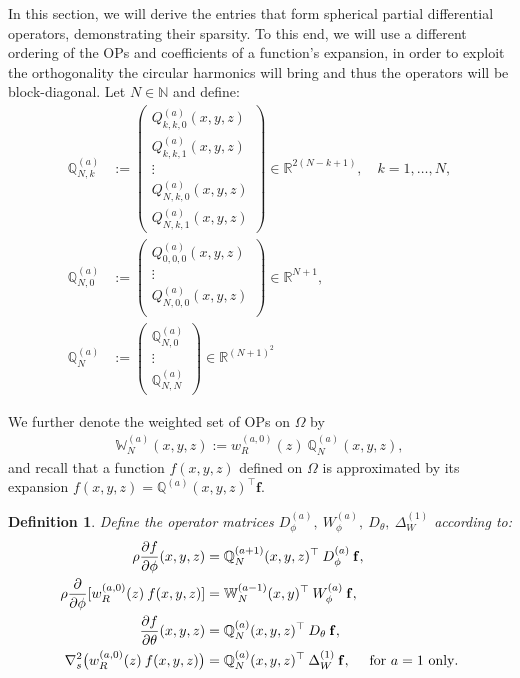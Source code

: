 \documentclass[11pt, oneside]{article}   	%
\newcommand{\R}{\mathbb{R}}
\newcommand{\N}{\mathbb{N}}
\newcommand{\genjac}{R}
\newcommand{\genjacw}{w_\genjac}
\newcommand{\bigW}{\mathbb{W}}
\newcommand{\scop}{Q}
\newcommand{\scopa}{\scop^{(a)}}
\newcommand{\bigscop}{{\mathbb{Q}}}
\newcommand{\bigscopa}{\bigscop^{(a)}}
\newcommand{\bigscopNa}{\bigscopa_{N}}
\newcommand{\bigscopNka}{\bigscopa_{N,k}}
\newcommand{\bigWNa}{\mathbb{W}_N^{(a)}}
\newtheorem{definition}{Definition}
\begin{document}
In this section, we will derive the entries that form spherical partial differential operators, demonstrating their sparsity. To this end, we will use a different ordering of the OPs and coefficients of a function's expansion, in order to exploit the orthogonality the circular harmonics will bring and thus the operators will be block-diagonal. Let $N \in \N$ and define: 
\begin{align}
	\bigscopNka &:= 
		\begin{pmatrix}
			\scopa_{k,k,0}(x,y,z) \\
			\scopa_{k,k,1}(x,y,z) \\
			\vdots \\
			\scopa_{N,k,0}(x,y,z) \\
			\scopa_{N,k,1}(x,y,z)
		\end{pmatrix} \in \R^{2(N-k+1)},  \quad k = 1,\dots,N, \label{eqn:OPdefNka} \\ 
	\bigscopa_{N,0} &:= 
		\begin{pmatrix}
			\scopa_{0,0,0}(x,y,z) \\
			\vdots \\
			\scopa_{N,0,0}(x,y,z) \\
		\end{pmatrix} \in \R^{N+1}, \label{eqn:OPdefN0a} \\
	\bigscopNa &:= 
		\begin{pmatrix}
			\bigscopa_{N,0} \\
			\vdots \\
			\bigscopa_{N,N}
		\end{pmatrix} \in \R^{(N+1)^2} \label{eqn:OPdefNa}
\end{align}

We further denote the weighted set of OPs on $\Omega$ by 
\begin{align*}
	\bigWNa(x,y,z) := \genjacw^{(a,0)}(z) \: \bigscopNa(x,y,z),
\end{align*}
and recall that a function $f(x,y,z)$ defined on $\Omega$ is approximated by its expansion $f(x,y,z) = \bigscopa(x,y,z)^\top \mathbf{f}$.

\begin{definition}\label{def:differentialoperators}
Define the operator matrices $D_\phi^{(a)}, \: W_\phi^{(a)}, \: D_\theta, \: \Delta^{(1)}_W$ according to:
\begin{align*}
	\rho {\partial f \over \partial \phi}(x,y,z)&= \bigscop_N^{(a+1)}(x,y,z)^\top \: D_\phi^{(a)} \: \mathbf{f}, \\
	\rho {\partial \over \partial \phi}[\genjacw^{(a,0)}(z) \: f(x,y,z)] &= \bigW_N^{(a-1)}(x,y)^\top \: W_\phi^{(a)}\: \mathbf{f}, \\
	{\partial f \over \partial \theta}(x,y,z) &= \bigscopNa(x,y,z)^\top \: D_\theta \: \mathbf{f}, \\
	\nabla^2_s \big( \genjacw^{(a,0)}(z) \: f(x,y,z) \big) &= \bigscopNa(x,y,z)^\top \: \Delta^{(1)}_W \: \mathbf{f}, \quad \text{ for } a = 1 \text{ only}.
\end{align*}
\end{definition}
\end{document}
